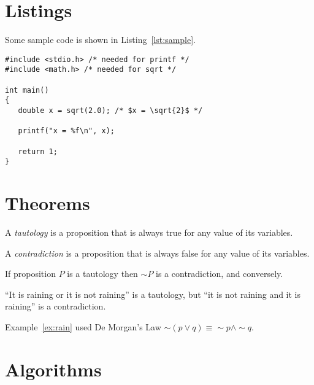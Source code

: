 \documentclass[oneside,12pt]{scrbook}
\theoremstyle{break}
\begin{document}
\section{Listings}

Some sample code is shown in Listing~\ref{lst:sample}.

\begin{lstlisting}[mathescape=true,caption={Sample},label={lst:sample}]
#include <stdio.h> /* needed for printf */
#include <math.h> /* needed for sqrt */

int main()
{
   double x = sqrt(2.0); /* $x = \sqrt{2}$ */

   printf("x = %f\n", x);

   return 1;
}
\end{lstlisting} 

\section{Theorems}

\begin{Definition}[Tautology]
A \emph{tautology} is a proposition that is always true for any
value of its variables.
\end{Definition}

\begin{Definition}[Contradiction]
A \emph{contradiction} is a proposition that is always false for any
value of its variables.
\end{Definition}

\begin{Theorem}
If proposition $P$ is a tautology
then $\sim P$ is a contradiction,
and conversely.
\end{Theorem}

\begin{Example}\label{ex:rain}
``It is raining or it is not raining'' is a tautology,
but ``it is not raining and it is raining'' is a contradiction.
\end{Example}

\begin{Remark}
Example~\ref{ex:rain} used De Morgan’s Law
$\sim (p \vee q) \equiv \sim p \wedge \sim q$.
\end{Remark}

\section{Algorithms}
\end{document}
